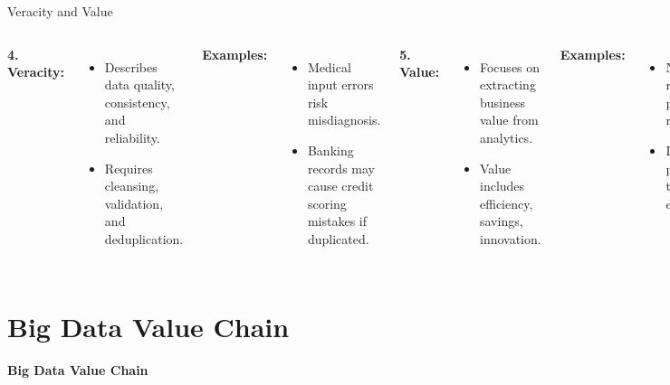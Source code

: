 \documentclass[aspectratio=169, table]{beamer}
\begin{document}
	\begin{frame}[fragile]{Veracity and Value}
		\vspace{20pt}
		\begin{columns}[T]
			\textbf{4. Veracity:}
			\begin{itemize}
				\item Describes data quality, consistency, and reliability.
				\item Requires cleansing, validation, and deduplication.
			\end{itemize}
			
			\vspace{10pt}
			\textbf{Examples:}
			\begin{itemize}
				\item Medical input errors risk misdiagnosis.
				\item Banking records may cause credit scoring mistakes if duplicated.
			\end{itemize}
			
			\textbf{5. Value:}
			\begin{itemize}
				\item Focuses on extracting business value from analytics.
				\item Value includes efficiency, savings, innovation.
			\end{itemize}
			
			\vspace{10pt}
			\textbf{Examples:}
			\begin{itemize}
				\item Netflix boosts retention with personal recommendations.
				\item DHL uses predictive models to cut costs and emissions.
			\end{itemize}
		\end{columns}
	\end{frame}
	
	
	\section{Big Data Value Chain}
	
	\begin{frame}{\hfill}
		\centering
		\Huge{\textbf{Big Data Value Chain}}
	\end{frame}
	
\end{document}
